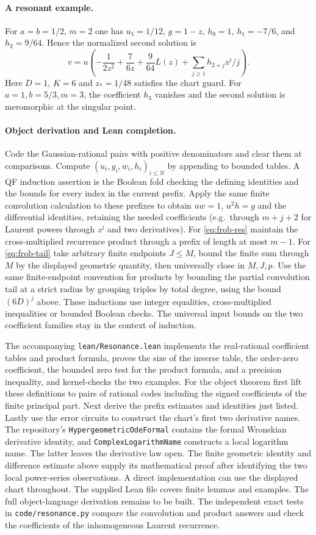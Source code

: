 \paragraph{A resonant example.}
For $a=b=1/2$, $m=2$ one has $u_1=1/12$, $g=1-z$, $h_0=1$,
$h_1=-7/6$, and $h_2=9/64$. Hence the normalized second solution is
\[
 v=u\left(-\frac1{2z^2}+\frac7{6z}
             +\frac9{64}L(z)+\sum_{j\ge1}h_{2+j}z^j/j\right).
\]
Here $D=1$, $K=6$ and $z_*=1/48$ satisfies the chart guard. For
$a=1,b=5/3,m=3$, the coefficient $h_3$ vanishes and the second solution
is meromorphic at the singular point.

\paragraph{Object derivation and Lean completion.}
Code the Gaussian-rational pairs with positive denominators and clear them at
comparisons. Compute $(u_i,g_i,w_i,h_i)_{i\le N}$ by appending to bounded
tables. A QF induction assertion is the Boolean fold checking the defining
identities and the bounds for every index in the current prefix. Apply
the same finite convolution calculation to these prefixes to obtain $uw=1$,
$u^2h=g$ and the differential identities, retaining the needed coefficients
(e.g.\ through $m+j+2$ for Laurent powers through $z^j$ and two derivatives).
For \eqref{eq:frob-res} maintain the cross-multiplied recurrence product
through a prefix of length at most $m-1$. For \eqref{eq:frob-tail} take
arbitrary finite endpoints $J\le M$, bound the finite sum through $M$ by
the displayed geometric quantity, then universally close in $M,J,p$.
Use the same finite-endpoint convention for products by bounding the partial
convolution tail at a strict radius by grouping triples by total degree,
using the bound $(6D)^j$ above. These inductions use integer equalities,
cross-multiplied inequalities or bounded Boolean checks. The universal input
bounds on the two coefficient families stay in the context of induction.

The accompanying \texttt{lean/Resonance.lean} implements the real-rational
coefficient tables and product formula, proves the size of the inverse table,
the order-zero coefficient, the bounded zero test for the product formula,
and a precision inequality, and kernel-checks the
two examples. For the object theorem first lift these definitions to pairs of
rational codes including the signed coefficients of the finite principal part.
Next derive the prefix estimates and identities just listed. Lastly use the
error circuits to construct the chart's first two derivative names. The
repository's \texttt{HypergeometricOdeFormal} contains the formal Wronskian
derivative identity, and \texttt{ComplexLogarithmName} constructs a local
logarithm name. The latter leaves the derivative law open. The finite
geometric identity and difference estimate above supply its mathematical
proof after identifying the two local power-series observations. A direct
implementation can use the displayed chart throughout. The supplied Lean
file covers finite lemmas and examples. The full object-language derivation
remains to be built. The independent exact tests in
\texttt{code/resonance.py} compare the convolution and product answers and
check the coefficients of the inhomogeneous Laurent recurrence.
